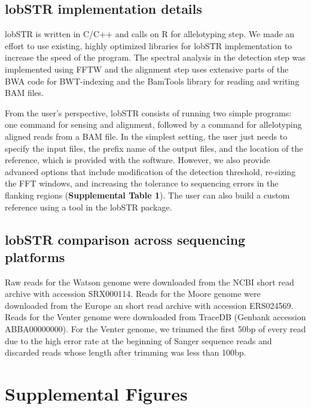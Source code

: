 {\subsection{lobSTR implementation details}
lobSTR is written in C/C++ and calls on R for allelotyping step. We made an effort to use existing, highly optimized libraries for lobSTR implementation to increase the speed of the program. The spectral analysis in the detection step was implemented using FFTW \cite{FrigoJohnson1998} and the alignment step uses extensive parts of the BWA code \cite{LiDurbin2009a} for BWT-indexing and the BamTools library \cite{BarnettGarrisonQuinlanEtAl2011} for reading and writing BAM files. 

From the user's perspective, lobSTR consists of running two simple programs: one command for sensing and alignment, followed by a command for allelotyping aligned reads from a BAM file. In the simplest setting, the user just needs to specify the input files, the prefix name of the output files, and the location of the reference, which is provided with the software. However, we also provide advanced options that include modification of the detection threshold, re-sizing the FFT windows, and increasing the tolerance to sequencing errors in the flanking regions (\textbf{Supplemental Table 1}). The user can also build a custom reference using a tool in the lobSTR package.

\subsection{lobSTR comparison across sequencing platforms}
Raw reads for the Watson genome were downloaded from the NCBI short read archive with accession SRX000114. Reads for the Moore genome were downloaded from the Europe	an short read archive with accession ERS024569. Reads for the Venter genome were downloaded from TraceDB (Genbank accession ABBA00000000). For the Venter genome, we trimmed the first 50bp of every read due to the high error rate at the beginning of Sanger sequence reads and discarded reads whose length after trimming was less than 100bp.

\pagebreak
\section{Supplemental Figures}

}
